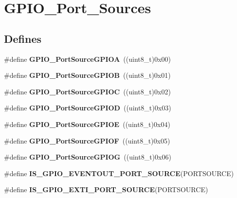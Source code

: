 \hypertarget{group__GPIO__Port__Sources}{
\section{GPIO\_\-Port\_\-Sources}
\label{group__GPIO__Port__Sources}
}
\subsection*{Defines}
\begin{DoxyCompactItemize}
\item 
\hypertarget{group__GPIO__Port__Sources_gacddaa6b6535b5de02ba99e75111c4924}{
\#define {\bfseries GPIO\_\-PortSourceGPIOA}~((uint8\_\-t)0x00)}
\label{group__GPIO__Port__Sources_gacddaa6b6535b5de02ba99e75111c4924}

\item 
\hypertarget{group__GPIO__Port__Sources_ga20a7ea6589564aee1fd5344bf01e65e5}{
\#define {\bfseries GPIO\_\-PortSourceGPIOB}~((uint8\_\-t)0x01)}
\label{group__GPIO__Port__Sources_ga20a7ea6589564aee1fd5344bf01e65e5}

\item 
\hypertarget{group__GPIO__Port__Sources_ga7511e96933d503ecf7128ebaff613e7e}{
\#define {\bfseries GPIO\_\-PortSourceGPIOC}~((uint8\_\-t)0x02)}
\label{group__GPIO__Port__Sources_ga7511e96933d503ecf7128ebaff613e7e}

\item 
\hypertarget{group__GPIO__Port__Sources_ga68309c29660ae328d3699781520e3d21}{
\#define {\bfseries GPIO\_\-PortSourceGPIOD}~((uint8\_\-t)0x03)}
\label{group__GPIO__Port__Sources_ga68309c29660ae328d3699781520e3d21}

\item 
\hypertarget{group__GPIO__Port__Sources_ga8b849f35292768d73a9f9a76cac96456}{
\#define {\bfseries GPIO\_\-PortSourceGPIOE}~((uint8\_\-t)0x04)}
\label{group__GPIO__Port__Sources_ga8b849f35292768d73a9f9a76cac96456}

\item 
\hypertarget{group__GPIO__Port__Sources_ga19dfaf7ac2cdf66b697bcd8665b860ef}{
\#define {\bfseries GPIO\_\-PortSourceGPIOF}~((uint8\_\-t)0x05)}
\label{group__GPIO__Port__Sources_ga19dfaf7ac2cdf66b697bcd8665b860ef}

\item 
\hypertarget{group__GPIO__Port__Sources_ga43af0aa9b42aefa2c7d24dfa9889040b}{
\#define {\bfseries GPIO\_\-PortSourceGPIOG}~((uint8\_\-t)0x06)}
\label{group__GPIO__Port__Sources_ga43af0aa9b42aefa2c7d24dfa9889040b}

\item 
\#define {\bfseries IS\_\-GPIO\_\-EVENTOUT\_\-PORT\_\-SOURCE}(PORTSOURCE)
\item 
\#define {\bfseries IS\_\-GPIO\_\-EXTI\_\-PORT\_\-SOURCE}(PORTSOURCE)
\end{DoxyCompactItemize}


